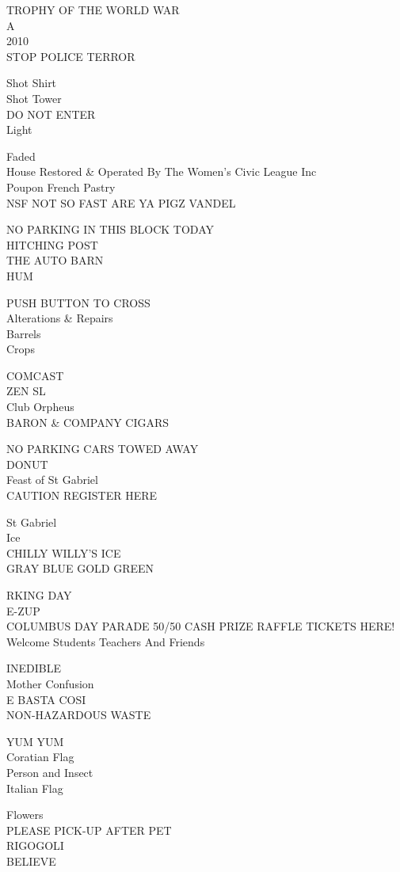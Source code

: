 \documentclass[10pt,letterpaper]{article}
\begin{document}
TROPHY OF THE WORLD WAR\\
A\\
2010\\
STOP POLICE TERROR

Shot Shirt\\
Shot Tower\\
DO NOT ENTER\\
Light

Faded\\
House Restored \& Operated By The Women's Civic League Inc\\
Poupon French Pastry\\
NSF NOT SO FAST ARE YA PIGZ VANDEL

NO PARKING IN THIS BLOCK TODAY\\
HITCHING POST\\
THE AUTO BARN\\
HUM

PUSH BUTTON TO CROSS\\
Alterations \& Repairs\\
Barrels\\
Crops

COMCAST\\
ZEN SL\\
Club Orpheus\\
BARON \& COMPANY CIGARS

NO PARKING CARS TOWED AWAY\\
DONUT\\
Feast of St Gabriel\\
CAUTION REGISTER HERE

St Gabriel\\
Ice\\
CHILLY WILLY'S ICE\\
GRAY BLUE GOLD GREEN

RKING DAY\\
E{-}ZUP\\
COLUMBUS DAY PARADE 50/50 CASH PRIZE RAFFLE TICKETS HERE!\\
Welcome Students Teachers And Friends

INEDIBLE\\
Mother Confusion\\
E BASTA COSI\\
NON{-}HAZARDOUS WASTE

YUM YUM\\
Coratian Flag\\
Person and Insect\\
Italian Flag

Flowers\\
PLEASE PICK{-}UP AFTER PET\\
RIGOGOLI\\
BELIEVE
\end{document}
